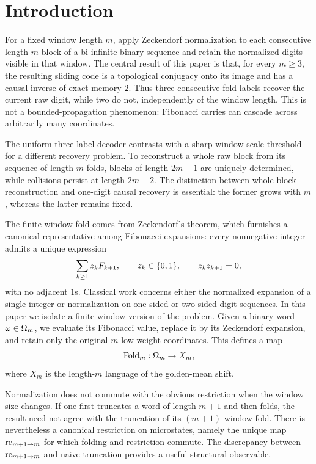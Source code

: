\section{Introduction}

For a fixed window length \(m\), apply Zeckendorf normalization to each consecutive length-\(m\) block of a bi-infinite binary sequence and retain the normalized digits visible in that window. The central result of this paper is that, for every \(m\ge3\), the resulting sliding code is a topological conjugacy onto its image and has a causal inverse of exact memory \(2\). Thus three consecutive fold labels recover the current raw digit, while two do not, independently of the window length. This is not a bounded-propagation phenomenon: Fibonacci carries can cascade across arbitrarily many coordinates.

The uniform three-label decoder contrasts with a sharp window-scale threshold for a different recovery problem. To reconstruct a whole raw block from its sequence of length-\(m\) folds, blocks of length \(2m-1\) are uniquely determined, while collisions persist at length \(2m-2\). The distinction between whole-block reconstruction and one-digit causal recovery is essential: the former grows with \(m\), whereas the latter remains fixed.

The finite-window fold comes from Zeckendorf's theorem, which furnishes a canonical representative among Fibonacci expansions: every nonnegative integer admits a unique expression
\[
\sum_{k\ge 1} z_kF_{k+1},
\qquad z_k\in\{0,1\},\qquad z_kz_{k+1}=0,
\]
with no adjacent \(1\)s. Classical work concerns either the normalized expansion of a single integer or normalization on one-sided or two-sided digit sequences. In this paper we isolate a finite-window version of the problem. Given a binary word \(\omega\in\Omega_m\), we evaluate its Fibonacci value, replace it by its Zeckendorf expansion, and retain only the original \(m\) low-weight coordinates. This defines a map
\[
\mathrm{Fold}_m:\Omega_m\to X_m,
\]
where \(X_m\) is the length-\(m\) language of the golden-mean shift.

Normalization does not commute with the obvious restriction when the window size changes. If one first truncates a word of length \(m+1\) and then folds, the result need not agree with the truncation of its \((m+1)\)-window fold. There is nevertheless a canonical restriction on microstates, namely the unique map \(\mathrm{re}_{m+1\to m}\) for which folding and restriction commute. The discrepancy between \(\mathrm{re}_{m+1\to m}\) and naive truncation provides a useful structural observable.


